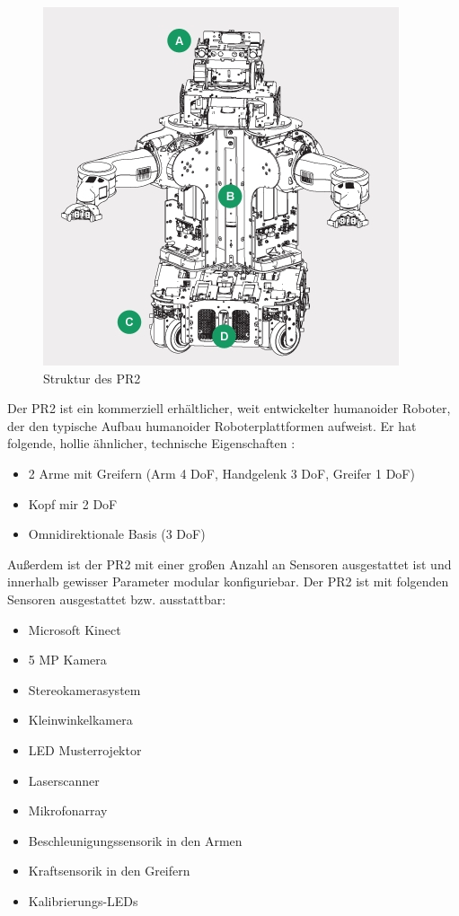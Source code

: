 \begin{figure}[h]
\center
\includegraphics[scale=0.5]{graphics/PR2Struktur.jpg}
\caption{\label{fig:PR2Struktur} Struktur des PR2 \citep{hspecsWG2012}}
\end{figure}

Der PR2 ist ein kommerziell erhältlicher, weit entwickelter humanoider Roboter, der den typische Aufbau humanoider Roboterplattformen aufweist.
 Er hat folgende, \gls{hollie} ähnlicher, technische Eigenschaften \citep{hspecsWG2012}:

\begin{itemize}
  \item 2 Arme mit Greifern (Arm 4 DoF, Handgelenk 3 DoF, Greifer 1 DoF)
  \item Kopf mir 2 DoF
  \item Omnidirektionale Basis (3 DoF)
\end{itemize}

Außerdem ist der PR2 mit einer großen Anzahl an Sensoren ausgestattet
 ist und innerhalb gewisser Parameter modular konfiguriebar.
 Der PR2 ist mit folgenden Sensoren ausgestattet bzw. ausstattbar:

\begin{itemize}
  \item Microsoft Kinect
  \item 5 MP Kamera
  \item Stereokamerasystem
  \item Kleinwinkelkamera
  \item LED Musterrojektor
  \item Laserscanner
  \item Mikrofonarray
  \item Beschleunigungssensorik in den Armen
  \item Kraftsensorik in den Greifern
  \item Kalibrierungs-LEDs
\end{itemize}

